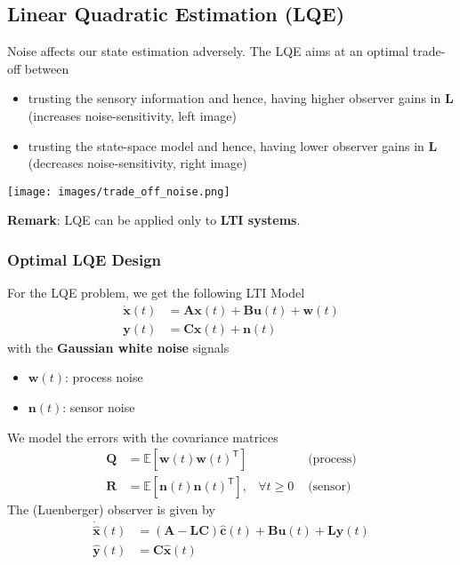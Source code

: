 \subsection{Linear Quadratic Estimation (LQE)}

Noise affects our state estimation adversely. The LQE aims at an optimal trade-off between
\begin{itemize}
    \item trusting the sensory information and hence, having higher observer gains in $\mathbf{L}$ (increases noise-sensitivity, left image)
    \item trusting the state-space model and hence, having lower observer gains in $\mathbf{L}$ (decreases noise-sensitivity, right image)
\end{itemize}
\begin{center}
    \texttt{[image: images/trade\_off\_noise.png]}
\end{center}

\textbf{Remark}: LQE can be applied only to \textbf{LTI systems}.\

\subsubsection{Optimal LQE Design}
For the LQE problem, we get the following LTI Model
\begin{align*}
    \dot{\mathbf{x}}(t) & = \mathbf{Ax}(t)+\mathbf{Bu}(t)+\mathbf{w}(t) \\
    \mathbf{y}(t)       & = \mathbf{Cx}(t)+\mathbf{n}(t)
\end{align*}
with the \textbf{Gaussian white noise} signals
\begin{itemize}
    \item $\mathbf{w}(t)$: process noise
    \item $\mathbf{n}(t)$: sensor noise
\end{itemize}
We model the errors with the covariance matrices
\begin{align*}
    \mathbf{Q} & =\mathbb{E}[\mathbf{w}(t){\mathbf{w}(t)}^{\mathsf{T}}]  &                & \text{ (process)} \\
    \mathbf{R} & =\mathbb{E}[\mathbf{n}(t){\mathbf{n}(t)}^{\mathsf{T}}], & \forall t\geq0 & \text{ (sensor)}
\end{align*}
The (Luenberger) observer is given by
\begin{align*}
    \dot{\hat{\textbf{x}}}(t) & =(\mathbf{A}-\mathbf{LC})\hat{\mathbf{c}}(t)+\mathbf{Bu}(t)+\mathbf{Ly}(t) \\
    \hat{\mathbf{y}}(t)       & =\mathbf{C}\hat{\mathbf{x}}(t)
\end{align*}

